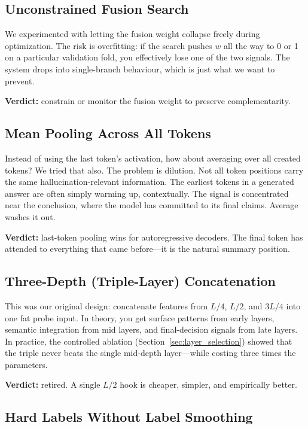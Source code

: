 \subsection{Unconstrained Fusion Search}

We experimented with letting the fusion weight collapse freely during optimization. The risk is overfitting: if the search pushes $w$ all the way to 0 or 1 on a particular validation fold, you effectively lose one of the two signals. The system drops into single-branch behaviour, which is just what we want to prevent.

\textbf{Verdict:} constrain or monitor the fusion weight to preserve complementarity.

\subsection{Mean Pooling Across All Tokens}

Instead of using the last token's activation, how about averaging over all created tokens? We tried that also. The problem is dilution.  Not all token positions carry the same hallucination-relevant information. The earliest tokens in a generated answer are often simply warming up, contextually. The signal is concentrated near the conclusion, where the model has committed to its final claims. Average washes it out.

\textbf{Verdict:} last-token pooling wins for autoregressive decoders. The final token has attended to everything that came before—it is the natural summary position.

\subsection{Three-Depth (Triple-Layer) Concatenation}

This was our original design: concatenate features from $L/4$, $L/2$, and $3L/4$ into one fat probe input. In theory, you get surface patterns from early layers, semantic integration from mid layers, and final-decision signals from late layers. In practice, the controlled ablation (Section~\ref{sec:layer_selection}) showed that the triple never beats the single mid-depth layer—while costing three times the parameters.

\textbf{Verdict:} retired. A single $L/2$ hook is cheaper, simpler, and empirically better.

\subsection{Hard Labels Without Label Smoothing}

